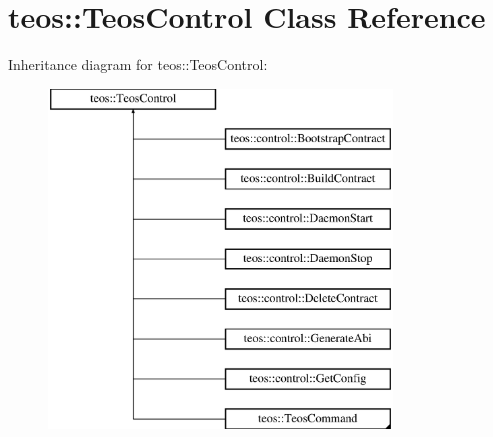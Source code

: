 \hypertarget{classteos_1_1_teos_control}{}\section{teos\+:\+:Teos\+Control Class Reference}
\label{classteos_1_1_teos_control}
Inheritance diagram for teos\+:\+:Teos\+Control\+:\begin{figure}[H]
\begin{center}
\leavevmode
\includegraphics[height=9.000000cm]{classteos_1_1_teos_control}
\end{center}
\end{figure}
